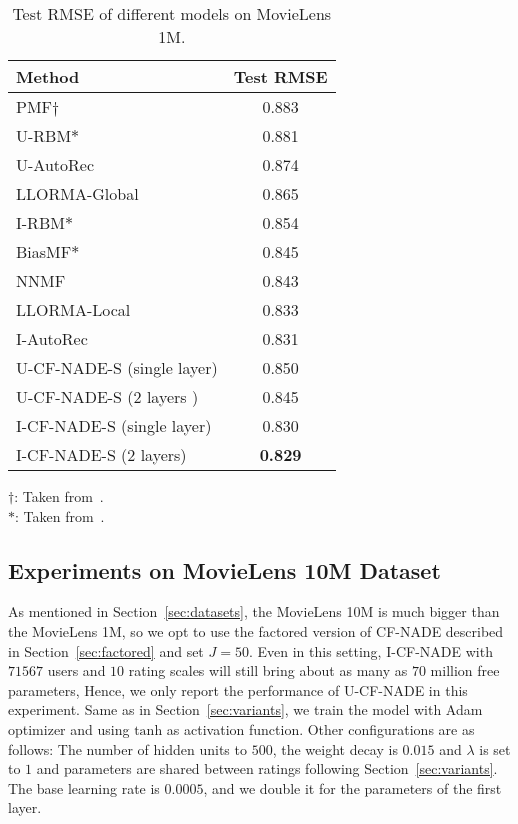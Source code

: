 \documentclass{article}
\newcommand{\cfnade}{CF-NADE\xspace}
\begin{document}
\begin{table}[h]
 \caption{Test RMSE of different models on MovieLens 1M.}
 \label{tab:movielens1m}
 \begin{center}
 \begin{small}
 \begin{sc}
 \begin{tabular}{lc}
 \hline
 \abovespace\belowspace
 Method & Test RMSE  \\
 \hline
 \abovespace
 PMF$\dagger$    & 0.883 \\
 U-RBM$\ast$ & 0.881\\
 U-AutoRec~\citep{sedhain2015autorec} & 0.874\\
 LLORMA-Global~\citep{lee2013local} & 0.865\\
 I-RBM$\ast$ & 0.854\\
 BiasMF$\ast$  & 0.845\\
 NNMF~\citep{dziugaite2015neural} &0.843\\
 LLORMA-Local~\citep{lee2013local} & 0.833\\
 \belowspace
 I-AutoRec~\citep{sedhain2015autorec} & 0.831\\
 U-{\cfnade}-S (single layer)  & 0.850 \\
 U-{\cfnade}-S (2 layers )  & 0.845 \\
 I-{\cfnade}-S (single layer) & 0.830\\
 I-{\cfnade}-S (2 layers) & {\bf 0.829}\\
 \hline
 \end{tabular}
 \end{sc}
 \end{small}
 \begin{minipage}{0.48\textwidth}
{\small
$\dagger$: Taken from~\citep{dziugaite2015neural}. \\
$\ast$: Taken from~\citep{sedhain2015autorec}.
}
\end{minipage}
 \end{center}
 \end{table}
 

 
\subsection{Experiments on MovieLens 10M Dataset}
\label{sec:movielens10m}
As mentioned in Section~\ref{sec:datasets}, the MovieLens 10M 
is much bigger than the MovieLens 1M, so we opt to use the factored
version of \cfnade described in Section~\ref{sec:factored} and set
$J=50$. Even in this setting, I-\cfnade with $71567$ users and $10$
rating scales will still bring about as many as $70$ million free
parameters,
Hence, we only report the performance of
U-\cfnade in this experiment. Same as in Section~\ref{sec:variants},
we train the model with Adam optimizer and using $\mathrm{tanh}$ as activation
function.  Other configurations are as follows: The number of hidden
units to $500$, the weight decay is $0.015$ and $\lambda$ is set to
$1$ and parameters are shared between ratings following
Section~\ref{sec:variants}. The base learning rate is $0.0005$, and we
double it for the parameters of the first layer.
\end{document}
